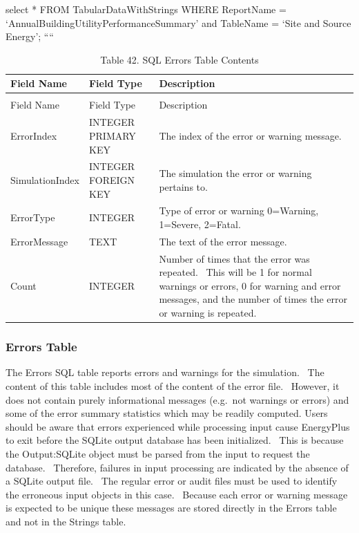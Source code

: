 select * FROM TabularDataWithStrings WHERE ReportName = `AnnualBuildingUtilityPerformanceSummary' and TableName = `Site and Source Energy'; ````

\begin{longtable}[c]{p{1.5in}p{1.5in}p{2.99in}}
\caption{Table 42. SQL Errors Table Contents \label{table:table-42.-sql-errors-table-contents}} \tabularnewline
\toprule 
Field Name & Field Type & Description \tabularnewline
\midrule
\endfirsthead

\caption[]{Table 42. SQL Errors Table Contents} \tabularnewline
\toprule 
Field Name & Field Type & Description \tabularnewline
\midrule
\endhead

ErrorIndex & INTEGER PRIMARY KEY & The index of the error or warning message. \tabularnewline
SimulationIndex & INTEGER FOREIGN KEY & The simulation the error or warning pertains to. \tabularnewline
ErrorType & INTEGER & Type of error or warning 0=Warning, 1=Severe, 2=Fatal. \tabularnewline
ErrorMessage & TEXT & The text of the error message. \tabularnewline
Count & INTEGER & Number of times that the error was repeated.~ This will be 1 for normal warnings or errors, 0 for warning and error messages, and the number of times the error or warning is repeated. \tabularnewline
\bottomrule
\end{longtable}

\subsubsection{Errors Table}\label{errors-table}

The Errors SQL table reports errors and warnings for the simulation.~ The content of this table includes most of the content of the error file.~ However, it does not contain purely informational messages (e.g.~not warnings or errors) and some of the error summary statistics which may be readily computed. Users should be aware that errors experienced while processing input cause EnergyPlus to exit before the SQLite output database has been initialized.~ This is because the Output:SQLite object must be parsed from the input to request the database.~ Therefore, failures in input processing are indicated by the absence of a SQLite output file.~ The regular error or audit files must be used to identify the erroneous input objects in this case.~ Because each error or warning message is expected to be unique these messages are stored directly in the Errors table and not in the Strings table.

